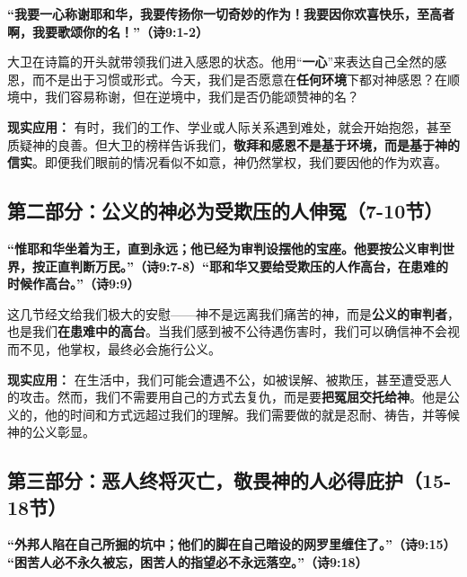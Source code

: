 \documentclass[a4paper, 12pt]{article}
\begin{document}
\textbf{“我要一心称谢耶和华，我要传扬你一切奇妙的作为！我要因你欢喜快乐，至高者啊，我要歌颂你的名！”（诗9:1-2）}

\vspace{0.2cm}

大卫在诗篇的开头就带领我们进入感恩的状态。他用“\textbf{一心}”来表达自己全然的感恩，而不是出于习惯或形式。今天，我们是否愿意在\textbf{任何环境}下都对神感恩？在顺境中，我们容易称谢，但在逆境中，我们是否仍能颂赞神的名？

\vspace{0.2cm}

\textbf{现实应用： } 
有时，我们的工作、学业或人际关系遇到难处，就会开始抱怨，甚至质疑神的良善。但大卫的榜样告诉我们，\textbf{敬拜和感恩不是基于环境，而是基于神的信实}。即便我们眼前的情况看似不如意，神仍然掌权，我们要因他的作为欢喜。


\subsection*{第二部分：公义的神必为受欺压的人伸冤（7-10节）}

\textbf{“惟耶和华坐着为王，直到永远；他已经为审判设摆他的宝座。他要按公义审判世界，按正直判断万民。”（诗9:7-8）“耶和华又要给受欺压的人作高台，在患难的时候作高台。”（诗9:9）}

\vspace{0.2cm}

这几节经文给我们极大的安慰——神不是远离我们痛苦的神，而是\textbf{公义的审判者}，也是我们\textbf{在患难中的高台}。当我们感到被不公待遇伤害时，我们可以确信神不会视而不见，他掌权，最终必会施行公义。

\vspace{0.2cm}

\textbf{现实应用： }
在生活中，我们可能会遭遇不公，如被误解、被欺压，甚至遭受恶人的攻击。然而，我们不需要用自己的方式去复仇，而是要\textbf{把冤屈交托给神}。他是公义的，他的时间和方式远超过我们的理解。我们需要做的就是忍耐、祷告，并等候神的公义彰显。


\subsection*{第三部分：恶人终将灭亡，敬畏神的人必得庇护（15-18节）}

\textbf{“外邦人陷在自己所掘的坑中；他们的脚在自己暗设的网罗里缠住了。”（诗9:15）}
\textbf{“困苦人必不永久被忘，困苦人的指望必不永远落空。”（诗9:18）}

\vspace{0.2cm}
\end{document}
